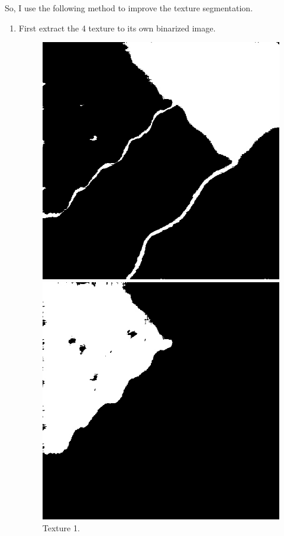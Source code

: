 \documentclass[12pt,a4paper,notitlepage,oneside,amsmath,amssymb]{article}
\begin{document}
\begin{CJK*}{UTF8}{bkai}
\begin{enumerate}[label=(\alph*)]
	So, I use the following method to improve the texture segmentation.

	\begin{enumerate}
		\item First extract the 4 texture to its own binarized image.

	\begin{figure}[hbt!]
		\centering
		\begin{minipage}{.25\textwidth}
			\centering
			\includegraphics[width=.9\linewidth]{sample2_texture1_0}
			\caption*{Texture 1.}
		\end{minipage}%
		\begin{minipage}{.25\textwidth}
			\centering
			\includegraphics[width=.9\linewidth]{sample2_texture2_0}

\end{minipage}
\end{figure}
\end{enumerate}
\end{enumerate}
\end{CJK*}
\end{document}
